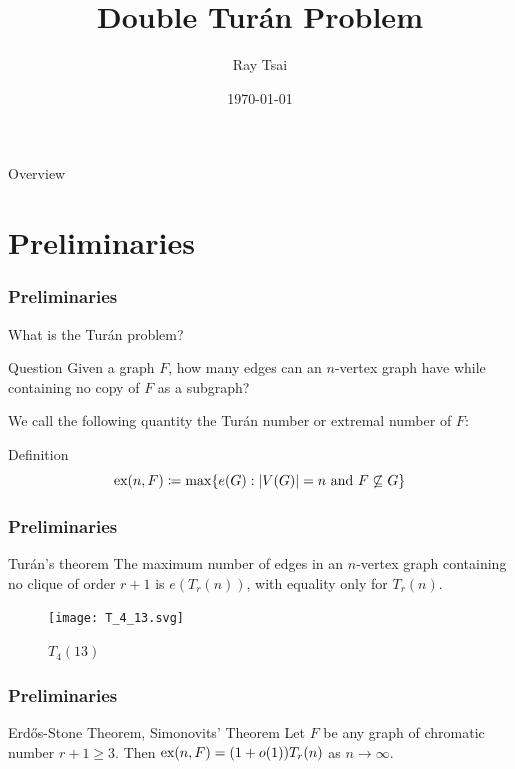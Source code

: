 \documentclass{beamer}
\title{Double Turán Problem}
\author{Ray Tsai}
\date{\today}
\newcommand*{\ex}{\textnormal{ex}}
\begin{document}
\frame{\titlepage}

\begin{frame}{Overview}
  \tableofcontents
\end{frame}

\section{Preliminaries}

\begin{frame}
\frametitle{Preliminaries}
What is the Turán problem? \pause

\begin{block}{Question}
  Given a graph $F$, how many edges can an $n$-vertex graph have while containing no copy of $F$ as a subgraph?
\end{block}

\pause

\vspace{0.5cm}

We call the following quantity the \alert{Turán number} or \alert{extremal number} of $F$:

\begin{block}{Definition}
  \[
    \ex(n, F) \coloneq \max \{ e(G) : |V(G)| = n \text{ and } F \not\subseteq G \}
  \]
\end{block}
\end{frame}

\begin{frame}
  \frametitle{Preliminaries}

  \begin{block}{Turán's theorem}
    The maximum number of edges in an $n$-vertex graph containing no clique of order $r + 1$ is $e(T_r(n))$, with equality only for $T_r(n)$.
  \end{block}

  \pause

  \begin{figure}
    \centering
    \texttt{[image: T\_4\_13.svg]}
    \caption{$T_4(13)$}
  \end{figure}
\end{frame}

\begin{frame}
  \frametitle{Preliminaries}

  \begin{block}{Erd\H{o}s-Stone Theorem, Simonovits' Theorem}
    Let $F$ be any graph of chromatic number $r + 1 \geq 3$. Then $\ex(n, F) = (1 + o(1))T_r(n)$ as $n \rightarrow \infty$.
  \end{block}
\end{frame}
\end{document}
